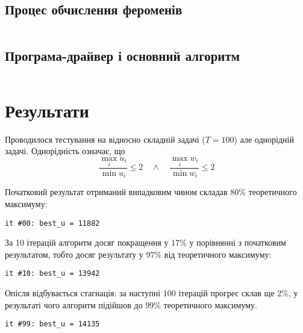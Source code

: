 \documentclass[a4paper, 12pt]{article}
\numberwithin{equation}{subsection}
\numberwithin{equation}{section}
\begin{document}
\inputminted{python}{generate_solution.py}

\subsection{Процес обчислення фероменів}

\inputminted{python}{calculate_feroments.py}

\subsection{Програма-драйвер і основний алгоритм}

\inputminted{python}{knapsack.py}

\section{Результати}

Проводилося тестування на відносно складній задачі ($T = 100$) але однорідній задачі. Однорідність означає, що
\begin{equation}
	\frac{\max_i u_i}{\min u_i} \le 2 \quad \land \quad \frac{\max_i w_i}{\min w_i} \le 2
\end{equation}

Початковий результат отриманий випадковим чином складав 80\% теоретичного максимуму:
\begin{verbatim}
it #00: best_u = 11882
\end{verbatim}

За 10 ітерацій алгоритм досяг покращення у 17\% у порівнянні з початковим результатом, тобто досяг результату у 97\% від теоретичного максимуму:
\begin{verbatim}
it #10: best_u = 13942
\end{verbatim}

Опісля відбувається стагнація: за наступні 100 ітерацій прогрес склав ще 2\%, у результаті чого алгоритм підійшов до 99\% теоретичного максимуму.
\begin{verbatim}
it #99: best_u = 14135
\end{verbatim}
\end{document}
